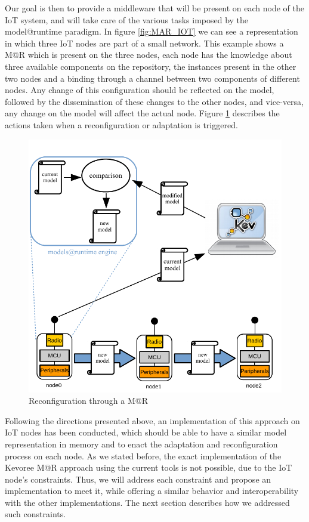 Our goal is then to provide a middleware that will be present on each node of the IoT system, and will take care of the various tasks imposed by the model@runtime paradigm.
In figure \ref{fig:MAR_IOT} we can see a representation in which three IoT nodes are part of a small network.
This example shows a M@R which is present on the three nodes, each node has the knowledge about three available components on the repository, the instances present in the other two nodes and a binding through a channel between two components of different nodes.
Any change of this configuration should be reflected on the model, followed by the dissemination of these changes to the other nodes, and vice-versa, any change on the model will affect the actual node.
Figure \ref{fig:MAR_reconfig} describes the actions taken when a reconfiguration or adaptation is triggered.

\begin{figure}[]
	\centering
	\includegraphics[width=1\columnwidth]{chapters/modelsAtRuntimeContiki.images/reconfigMAR.pdf}
	\caption{Reconfiguration through a M@R}
	\label{fig:MAR_reconfig}
\end{figure}

Following the directions presented above, an implementation of this approach on IoT nodes has been conducted, which should be able to have a similar model representation in memory and to enact the adaptation and reconfiguration process on each node.
As we stated before, the exact implementation of the Kevoree M@R approach using the current tools is not possible, due to the IoT node's constraints.
Thus, we will address each constraint and propose an implementation to meet it, while offering a similar behavior and interoperability with the other implementations.
The next section describes how we addressed such constraints.

